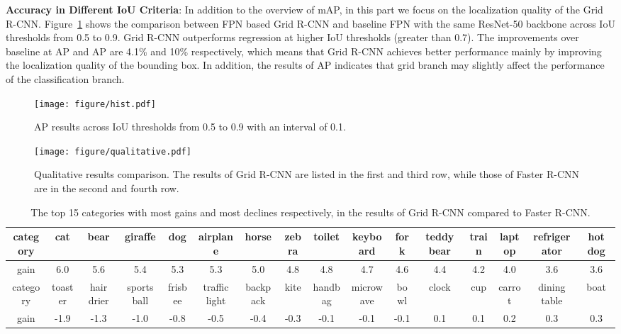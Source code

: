 \documentclass[10pt,twocolumn,letterpaper]{article}
\begin{document}
\textbf{Accuracy in Different IoU Criteria}: In addition to the overview of mAP, in this part we focus on the localization quality of the Grid R-CNN.
Figure~\ref{Fig.hist} shows the comparison between FPN based Grid R-CNN and baseline FPN with the same ResNet-50 backbone across IoU thresholds from 0.5 to 0.9. Grid R-CNN outperforms regression at higher IoU thresholds (greater than 0.7). The improvements over baseline at AP and AP are 4.1\% and 10\% respectively, which means that Grid R-CNN achieves better performance mainly by improving the localization quality of the bounding box. In addition, the results of AP indicates that grid branch may slightly affect the performance of the classification branch.


\begin{figure}[h] 
\centering 
\texttt{[image: figure/hist.pdf]}
\caption{AP results across IoU thresholds from 0.5 to 0.9 with an interval of 0.1.} 
\label{Fig.hist} 
\end{figure}

\begin{figure*}[t]
\centering
\label{qualitative}
\texttt{[image: figure/qualitative.pdf]}
\caption{Qualitative results comparison. The results of Grid R-CNN are listed in the first and third row, while those of Faster R-CNN are in the second and fourth row. }
\label{fig:qualitative}
\end{figure*}

\begin{table*}[ht]
\setlength{\tabcolsep}{0.5mm}
\footnotesize
\begin{center}
\begin{tabular}{ | c | c | c | c  | c | c | c | c | c | c | c  |c | c | c | c | c  |  }
\hline
category & cat & bear & giraffe & dog & airplane & horse & zebra & toilet & keyboard & fork & teddy bear & train & laptop & refrigerator & hot dog\\
\hline
gain & 6.0 & 5.6 & 5.4 & 5.3 & 5.3 & 5.0 & 4.8 & 4.8 & 4.7 &  4.6 & 4.4 & 4.2 & 4.0 & 3.6 & 3.6\\
\hline
category & toaster & hair drier & sports ball & frisbee& traffic light & backpack & kite & handbag & microwave & bowl & clock & cup & carrot & dining table & boat\\
\hline
gain & -1.9& -1.3 & -1.0 & -0.8 & -0.5 & -0.4 & -0.3 & -0.1 & -0.1 & -0.1 & 0.1 & 0.1 & 0.2 & 0.3 & 0.3 \\
\hline
\end{tabular}
\vspace{1mm}
\caption{The top 15 categories with most gains and most declines respectively, in the results of Grid R-CNN compared to Faster R-CNN.}
\label{tab:top10}
\end{center}
\end{table*}
\end{document}
